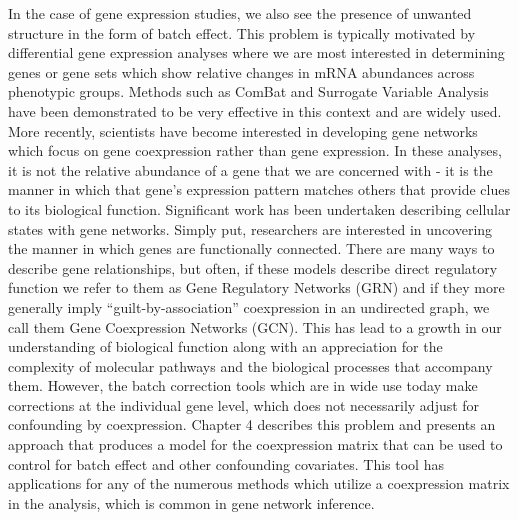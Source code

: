In the case of gene expression studies, we also see the presence of unwanted structure in the form of batch effect.  This problem is typically motivated by differential gene expression analyses where we are most interested in determining genes or gene sets which show relative changes in mRNA abundances across phenotypic groups.  Methods such as ComBat and Surrogate Variable Analysis have been demonstrated to be very effective in this context and are widely used. More recently, scientists have become interested in developing gene networks which focus on gene coexpression rather than gene expression. In these analyses, it is not the relative abundance of a gene that we are concerned with - it is the manner in which that gene's expression pattern matches others that provide clues to its biological function. Significant work has been undertaken describing cellular states with gene networks.  Simply put, researchers are interested in uncovering the manner in which genes are functionally connected. There are many ways to describe gene relationships, but often, if these models describe direct regulatory function we refer to them as Gene Regulatory Networks (GRN) and if they more generally imply ``guilt-by-association'' coexpression in an undirected graph, we call them Gene Coexpression Networks (GCN). This has lead to a growth in our understanding of biological function along with an appreciation for the complexity of molecular pathways and the biological processes that accompany them.  However, the batch correction tools which are in wide use today make corrections at the individual gene level, which does not necessarily adjust for confounding by coexpression.  Chapter 4 describes this problem and presents an approach that produces a model for the coexpression matrix that can be used to control for batch effect and other confounding covariates.  This tool has applications for any of the numerous methods which utilize a coexpression matrix in the analysis, which is common in gene network inference.

